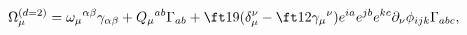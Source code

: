 \begin{equation}
\Omega_\mu^{(d=2)}=\omega_\mu{}^{\alpha\beta}
\gamma_{\alpha\beta}+Q_\mu{}^{ab}\Gamma_{ab}+\ft19(\delta_\mu^\nu-
\ft12\gamma_\mu{}^\nu)e^{ia}e^{jb}e^{kc}\partial_\nu\phi_{ijk}\Gamma_{abc},
\label{eq:d2omega}
\end{equation}

